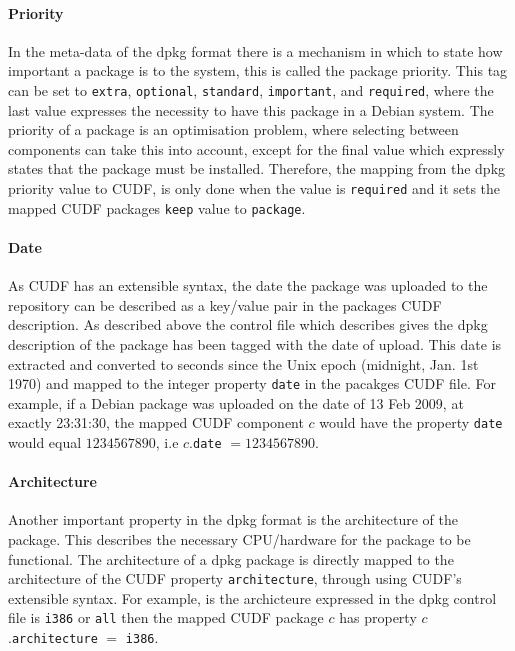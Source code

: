 \paragraph{Priority}
In the meta-data of the dpkg format there is a mechanism in which to state how important a package is to the system, this is called the package priority.
This tag can be set to \verb+extra+, \verb+optional+, \verb+standard+, \verb+important+, and \verb+required+, where the last value expresses the necessity to have this package in a Debian system.
The priority of a package is an optimisation problem, where selecting between components can take this into account, 
except for the final value which expressly states that the package must be installed.
Therefore, the mapping from the dpkg priority value to CUDF, is only done when the value is \verb+required+ and it sets the mapped CUDF packages \verb+keep+ value to \verb+package+.

\paragraph{Date}
As CUDF has an extensible syntax, the date the package was uploaded to the repository can be described as a key/value pair in the packages CUDF description.
As described above the control file which describes gives the dpkg description of the package has been tagged with the date of upload.
This date is extracted and converted to seconds since the Unix epoch (midnight, Jan. 1st 1970) and mapped to the integer property \verb+date+ in the pacakges CUDF file.
For example, if a Debian package was uploaded on the date of 13 Feb 2009, at exactly 23:31:30, 
the mapped CUDF component $c$ would have the property \verb+date+ would equal $1234567890$, i.e $c$.\verb+date+ $= 1234567890$.

\paragraph{Architecture}
Another important property in the dpkg format is the architecture of the package.
This describes the necessary CPU/hardware for the package to be functional.
The architecture of a dpkg package is directly mapped to the architecture of the CUDF property \verb+architecture+, through using CUDF's extensible syntax.
For example, is the archicteure expressed in the dpkg control file is \verb+i386+ or \verb+all+ then the mapped CUDF package $c$ has property $c$.\verb+architecture+ $=$ \verb+i386+.

